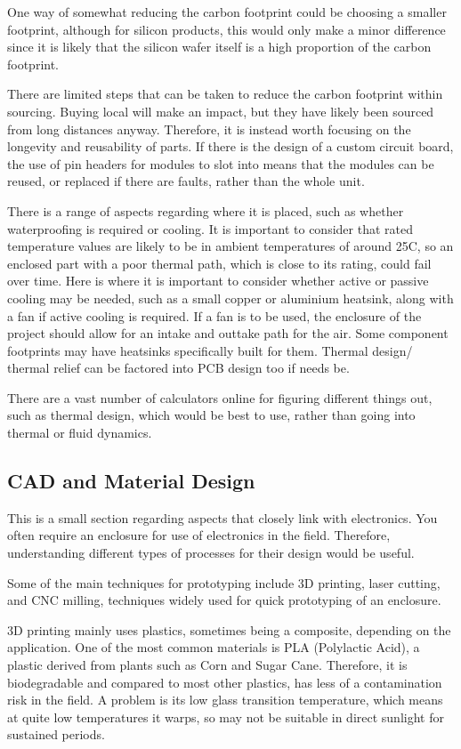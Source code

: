 \documentclass[a4paper,11pt]{report}
\begin{document}
One way of somewhat reducing the carbon footprint could be choosing a smaller footprint, although for silicon products, this would only make a minor difference since it is likely that the silicon wafer itself is a high proportion of the carbon footprint.

There are limited steps that can be taken to reduce the carbon footprint within sourcing. Buying local will make an impact, but they have likely been sourced from long distances anyway. Therefore, it is instead worth focusing on the longevity and reusability of parts. If there is the design of a custom circuit board, the use of pin headers for modules to slot into means that the modules can be reused, or replaced if there are faults, rather than the whole unit.

There is a range of aspects regarding where it is placed, such as whether waterproofing is required or cooling. It is important to consider that rated temperature values are likely to be in ambient temperatures of around 25C, so an enclosed part with a poor thermal path, which is close to its rating, could fail over time. Here is where it is important to consider whether active or passive cooling may be needed, such as a small copper or aluminium heatsink, along with a fan if active cooling is required. If a fan is to be used, the enclosure of the project should allow for an intake and outtake path for the air. Some component footprints may have heatsinks specifically built for them. Thermal design/ thermal relief can be factored into PCB design too if needs be.

There are a vast number of calculators online for figuring different things out, such as thermal design, which would be best to use, rather than going into thermal or fluid dynamics.

\subsection{CAD and Material Design}

This is a small section regarding aspects that closely link with electronics. You often require an enclosure for use of electronics in the field. Therefore, understanding different types of processes for their design would be useful.

Some of the main techniques for prototyping include 3D printing, laser cutting, and CNC milling, techniques widely used for quick prototyping of an enclosure.

3D printing mainly uses plastics, sometimes being a composite, depending on the application. One of the most common materials is PLA (Polylactic Acid), a plastic derived from plants such as Corn and Sugar Cane. Therefore, it is biodegradable and compared to most other plastics, has less of a contamination risk in the field. A problem is its low glass transition temperature, which means at quite low temperatures it warps, so may not be suitable in direct sunlight for sustained periods.
\end{document}
